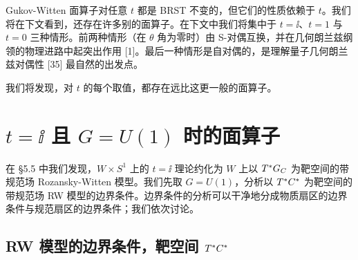 Gukov-Witten 面算子对任意 $t$ 都是 BRST 不变的，但它们的性质依赖于 $t$。我们将在下文看到，还存在许多别的面算子。在下文中我们将集中于 $t=\ii$、$t=1$ 与 $t=0$ 三种情形。前两种情形（在 $\theta$ 角为零时）由 S-对偶互换，并在几何朗兰兹纲领的物理进路中起突出作用 [1]。最后一种情形是自对偶的，是理解量子几何朗兰兹对偶性 [35] 最自然的出发点。

我们将发现，对 $t$ 的每个取值，都存在远比这更一般的面算子。



\section{\texorpdfstring{$t=\ii$}{t=i} 且 \texorpdfstring{$G=U(1)$}{G=U(1)} 时的面算子}

在 §5.5 中我们发现，$W\times S^1$ 上的 $t=\ii$ 理论约化为 $W$ 上以 $T^*G_C$ 为靶空间的带规范场 Rozansky-Witten 模型。我们先取 $G=U(1)$，分析以 $T^*C^*$ 为靶空间的带规范场 RW 模型的边界条件。边界条件的分析可以干净地分成物质扇区的边界条件与规范扇区的边界条件；我们依次讨论。



\subsection{RW 模型的边界条件，靶空间 \texorpdfstring{$T^*C^*$}{T*C*}}

